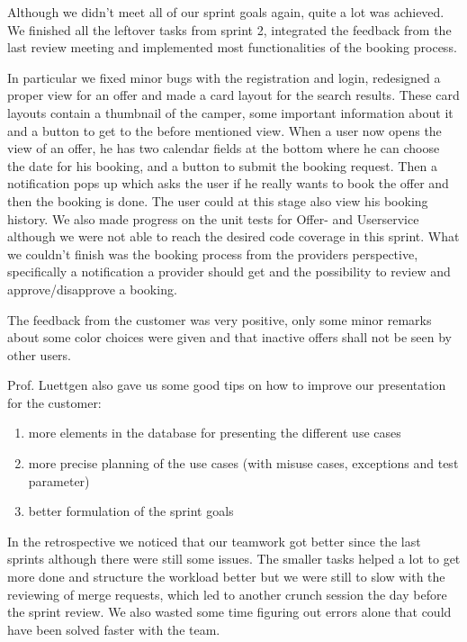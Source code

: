 Although we didn't meet all of our sprint goals again, quite a lot was achieved.
We finished all the leftover tasks from sprint 2, integrated the feedback from the last review meeting and implemented most functionalities of the booking process.

In particular we fixed minor bugs with the registration and login, redesigned a proper view for an offer and made a card layout for the search results.
These card layouts contain a thumbnail of the camper, some important information about it and a button to get to the before mentioned view.
When a user now opens the view of an offer, he has two calendar fields at the bottom where he can choose the date for his booking,
and a button to submit the booking request. Then a notification pops up which asks the user if he really wants to book the offer
and then the booking is done. The user could at this stage also view his booking history.
We also made progress on the unit tests for Offer- and Userservice although we were not able to reach the desired code coverage in this sprint.
What we couldn't finish was the booking process from the providers perspective, specifically a notification a provider should get and the possibility to review and approve/disapprove a booking.

The feedback from the customer was very positive, only some minor remarks about some color choices were given and that inactive offers shall not be seen by other users.

Prof. Luettgen also gave us some good tips on how to improve our presentation for the customer:
\begin{enumerate}
    \item more elements in the database for presenting the different use cases
    \item more precise planning of the use cases (with misuse cases, exceptions and test parameter)
    \item better formulation of the sprint goals
\end{enumerate}

In the retrospective we noticed that our teamwork got better since the last sprints although there were still some issues.
The smaller tasks helped a lot to get more done and structure the workload better but we were still to slow with the reviewing of merge requests, which led to another crunch session the day before the sprint review.
We also wasted some time figuring out errors alone that could have been solved faster with the team.
